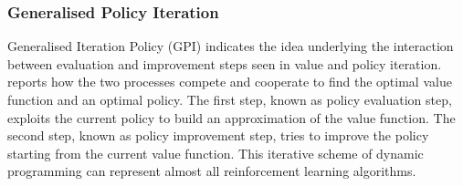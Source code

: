 \subsubsection{Generalised Policy Iteration}

Generalised Iteration Policy (GPI) indicates the idea underlying the interaction between evaluation and improvement steps seen in value and policy iteration.
 reports how the two processes compete and cooperate to find the optimal value function and an optimal policy.
The first step, known as policy evaluation step, exploits the current policy to build an approximation of the value function.
The second step, known as policy improvement step, tries to improve the policy starting from the current value function.
This iterative scheme of dynamic programming can represent almost all reinforcement learning algorithms.

